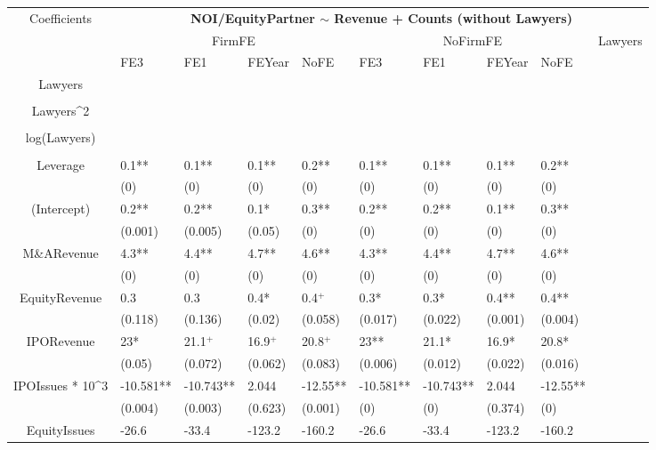 \documentclass{article}
\begin{document}
\begin{table}[H]
\centering
\begin{tabular}{|clllllllll|}
\hline
\multirow{3}{*}{Coefficients} & \multicolumn{9}{c|}{\textbf{NOI/EquityPartner $\sim$ Revenue + Counts (without Lawyers)}} \\
\cline{2-10}
& \multicolumn{4}{c}{FirmFE} & \multicolumn{4}{c}{NoFirmFE} & \multirow{2}{*}{Lawyers} \\
\cline{2-9}
& FE3 & FE1 & FEYear & NoFE & FE3 & FE1 & FEYear & NoFE &  \\
\hline
 
Lawyers &  &  &  &  &  &  &  &  & \\ 
   &  &  &  &  &  &  &  &  & \\ 
  Lawyers^2 &  &  &  &  &  &  &  &  & \\ 
   &  &  &  &  &  &  &  &  & \\ 
  log(Lawyers) &  &  &  &  &  &  &  &  & \\ 
   &  &  &  &  &  &  &  &  & \\ 
  Leverage & 0.1** & 0.1** & 0.1** & 0.2** & 0.1** & 0.1** & 0.1** & 0.2** & \\ 
   & (0) & (0) & (0) & (0) & (0) & (0) & (0) & (0) & \\ 
  (Intercept) & 0.2** & 0.2** & 0.1* & 0.3** & 0.2** & 0.2** & 0.1** & 0.3** & \\ 
   & (0.001) & (0.005) & (0.05) & (0) & (0) & (0) & (0) & (0) & \\ 
  M\&ARevenue & 4.3** & 4.4** & 4.7** & 4.6** & 4.3** & 4.4** & 4.7** & 4.6** & \\ 
   & (0) & (0) & (0) & (0) & (0) & (0) & (0) & (0) & \\ 
  EquityRevenue & 0.3 & 0.3 & 0.4* & 0.4$^{+}$ & 0.3* & 0.3* & 0.4** & 0.4** & \\ 
   & (0.118) & (0.136) & (0.02) & (0.058) & (0.017) & (0.022) & (0.001) & (0.004) & \\ 
  IPORevenue & 23* & 21.1$^{+}$ & 16.9$^{+}$ & 20.8$^{+}$ & 23** & 21.1* & 16.9* & 20.8* & \\ 
   & (0.05) & (0.072) & (0.062) & (0.083) & (0.006) & (0.012) & (0.022) & (0.016) & \\ 
  IPOIssues * 10^3 & -10.581** & -10.743** & 2.044 & -12.55** & -10.581** & -10.743** & 2.044 & -12.55** & \\ 
   & (0.004) & (0.003) & (0.623) & (0.001) & (0) & (0) & (0.374) & (0) & \\ 
  EquityIssues & -26.6 & -33.4 & -123.2 & -160.2 & -26.6 & -33.4 & -123.2 & -160.2 & \\ 

\end{tabular}
\end{table}
\end{document}
